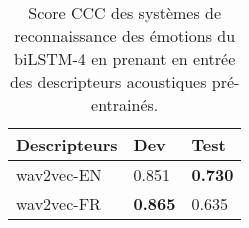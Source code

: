 \begin{table}[h]
  \centering
  \begin{tabular}{|l|l|l|}
  \hline
  Descripteurs   &Dev   &Test  \\
  \hline
  wav2vec-EN      &0.851 &\textbf{0.730} \\
  wav2vec-FR      &\textbf{0.865} &0.635 \\
  \hline
\end{tabular}
\caption{Score CCC des systèmes de reconnaissance des émotions du biLSTM-4 en prenant en entrée des descripteurs acoustiques pré-entrainés.}
\label{tab:res_wav2vec}
\end{table}
